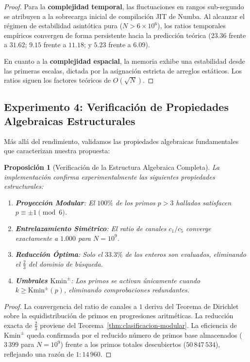 \documentclass{article}
\numberwithin{equation}{section}
\theoremstyle{plain}
\newtheorem{proposition}[theorem]{Proposición}
\theoremstyle{definition}
\begin{document}
\begin{proof}
Para la \textbf{complejidad temporal}, las fluctuaciones en rangos sub-segundo se atribuyen a la sobrecarga inicial de compilación JIT de Numba. Al alcanzar el régimen de estabilidad asintótica pura ($N > 6\times10^6$), los ratios temporales empíricos convergen de forma persistente hacia la predicción teórica ($23.36$ frente a $31.62$; $9.15$ frente a $11.18$; y $5.23$ frente a $6.09$).

En cuanto a la \textbf{complejidad espacial}, la memoria exhibe una estabilidad desde las primeras escalas, dictada por la asignación estricta de arreglos estáticos. Los ratios siguen los factores teóricos de $O(\sqrt{N})$.
\end{proof}

\subsection{Experimento 4: Verificación de Propiedades Algebraicas Estructurales}

Más allá del rendimiento, validamos las propiedades algebraicas fundamentales que caracterizan nuestra propuesta:

\begin{proposition}[Verificación de la Estructura Algebraica Completa]
\label{prop:verificacion-algebraica}
La implementación confirma experimentalmente las siguientes propiedades estructurales:
\begin{enumerate}
    \item \textbf{Proyección Modular}: El $100\%$ de los primos $p > 3$ hallados satisfacen $p \equiv \pm 1 \pmod{6}$.
    \item \textbf{Entrelazamiento Simétrico}: El ratio de canales $c_1/c_5$ converge exactamente a $1.000$ para $N=10^9$.
    \item \textbf{Reducción Óptima}: Solo el $33.3\%$ de los enteros son evaluados, eliminando el $\frac{2}{3}$ del dominio de búsqueda.
    \item \textbf{Umbrales $\mathrm{Kmin}^\pm$}: Los primos se activan únicamente cuando $k \ge \mathrm{Kmin}^\pm(p)$, eliminando comprobaciones redundantes.
\end{enumerate}
\end{proposition}

\begin{proof}
La convergencia del ratio de canales a $1$ deriva del Teorema de Dirichlet sobre la equidistribución de primos en progresiones aritméticas. La reducción exacta de $\frac{2}{3}$ proviene del Teorema~\ref{thm:clasificacion-modular}. La eficiencia de $\mathrm{Kmin}^\pm$ queda confirmada por el reducido número de primos base almacenados ($3\,399$ para $N=10^9$) frente a los primos totales descubiertos ($50\,847\,534$), reflejando una razón de $1:14\,960$.
\end{proof}
\end{document}
